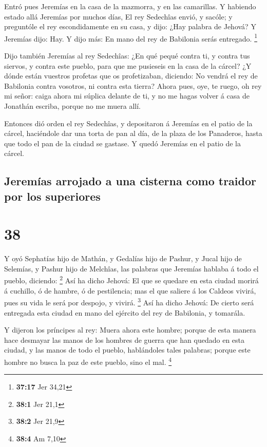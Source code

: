  Entró pues Jeremías en la casa de la mazmorra, y en las
camarillas. Y habiendo estado allá Jeremías por muchos días,
 El rey Sedechîas envió, y sacóle; y preguntóle el rey
escondidamente en su casa, y dijo: ¿Hay palabra de Jehová? Y Jeremías
dijo: Hay. Y dijo más: En mano del rey de Babilonia serás entregado.
\footnote{\textbf{37:17} Jer 34,21}

 Dijo también Jeremías al rey Sedechîas: ¿En qué pequé
contra ti, y contra tus siervos, y contra este pueblo, para que me
pusieseis en la casa de la cárcel?  ¿Y dónde están vuestros
profetas que os profetizaban, diciendo: No vendrá el rey de Babilonia
contra vosotros, ni contra esta tierra?  Ahora pues, oye,
te ruego, oh rey mi señor: caiga ahora mi súplica delante de ti, y no me
hagas volver á casa de Jonathán escriba, porque no me muera allí.

 Entonces dió orden el rey Sedechîas, y depositaron á
Jeremías en el patio de la cárcel, haciéndole dar una torta de pan al
día, de la plaza de los Panaderos, hasta que todo el pan de la ciudad se
gastase. Y quedó Jeremías en el patio de la cárcel.

\hypertarget{jeremuxedas-arrojado-a-una-cisterna-como-traidor-por-los-superiores}{%
\subsection{Jeremías arrojado a una cisterna como traidor por los
superiores}\label{jeremuxedas-arrojado-a-una-cisterna-como-traidor-por-los-superiores}}

\hypertarget{section-37}{%
\section{38}\label{section-37}}

 Y oyó Sephatías hijo de Mathán, y Gedalías hijo de Pashur,
y Jucal hijo de Selemías, y Pashur hijo de Melchîas, las palabras que
Jeremías hablaba á todo el pueblo, diciendo: \footnote{\textbf{38:1} Jer
  21,1}  Así ha dicho Jehová: El que se quedare en esta
ciudad morirá á cuchillo, ó de hambre, ó de pestilencia; mas el que
saliere á los Caldeos vivirá, pues su vida le será por despojo, y
vivirá. \footnote{\textbf{38:2} Jer 21,9}  Así ha dicho
Jehová: De cierto será entregada esta ciudad en mano del ejército del
rey de Babilonia, y tomarála.

 Y dijeron los príncipes al rey: Muera ahora este hombre;
porque de esta manera hace desmayar las manos de los hombres de guerra
que han quedado en esta ciudad, y las manos de todo el pueblo,
hablándoles tales palabras; porque este hombre no busca la paz de este
pueblo, sino el mal. \footnote{\textbf{38:4} Am 7,10}

